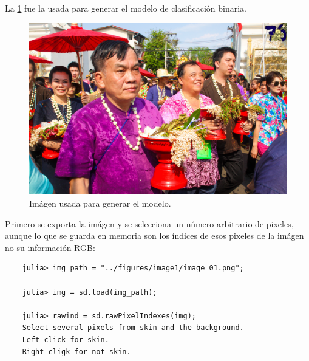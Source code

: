 La \cref{fig:imágen-entrenamiento} fue la usada para generar el modelo de clasificación binaria.
\begin{figure}[ht!]
    \centering
    \includegraphics[scale=0.25]{../figures/image1/image_01.png}
    \caption{Imágen usada para generar el modelo.}
    \label{fig:imágen-entrenamiento}
\end{figure}
Primero se exporta la imágen y se selecciona un número arbitrario de pixeles, aunque lo que se guarda en memoria son los índices de esos pixeles de la imágen no su información RGB:
\begin{verbatim}
    julia> img_path = "../figures/image1/image_01.png";

    julia> img = sd.load(img_path);

    julia> rawind = sd.rawPixelIndexes(img);
    Select several pixels from skin and the background.
    Left-click for skin.
    Right-cligk for not-skin.
\end{verbatim}

